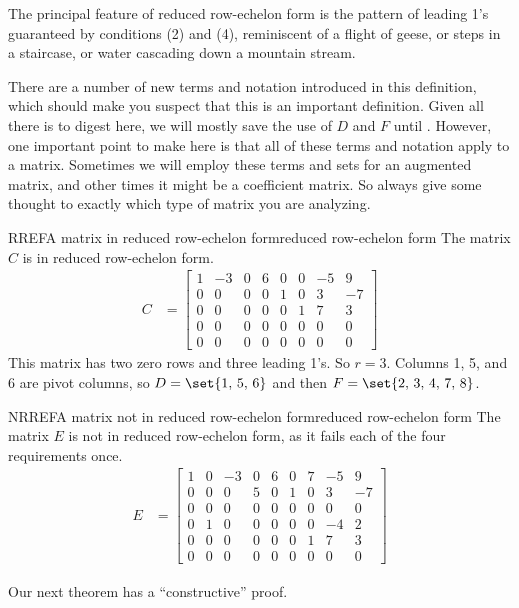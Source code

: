 %
The principal feature of reduced row-echelon form is the pattern of leading 1's guaranteed by conditions (2) and (4), reminiscent of a flight of geese, or steps in a staircase, or water cascading down a mountain stream.\par
%
There are a number of new terms and notation introduced in this definition, which should make you suspect that this is an important definition.  Given all there is to digest here, we will mostly save the use of $D$ and $F$ until .  However, one important point to make here is that all of these terms and notation apply to a matrix.  Sometimes we will employ these terms and sets for an augmented matrix, and other times it might be a coefficient matrix.  So always give some thought to exactly which type of matrix you are analyzing.
%
\begin{example}{RREF}{A matrix in reduced row-echelon form}{reduced row-echelon form}
The matrix $C$ is in reduced row-echelon form.
\begin{align*}
C&=
\begin{bmatrix}
1&-3&0&6&0&0&-5&9\\
0&0&0&0&1&0&3&-7\\
0&0&0&0&0&1&7&3\\
0&0&0&0&0&0&0&0\\
0&0&0&0&0&0&0&0
\end{bmatrix}
\end{align*}
This matrix has two zero rows and three leading 1's.   So $r=3$.  Columns 1, 5, and 6 are pivot columns, so $D=\set{1,\,5,\,6}$ and then $F=\set{2,\,3,\,4,\,7,\,8}$.
\end{example}
%
\begin{example}{NRREF}{A matrix not in reduced row-echelon form}{reduced row-echelon form}
The matrix $E$ is not in reduced row-echelon form, as it fails each of the four requirements once.
\begin{align*}
E&=
\begin{bmatrix}
1&0&-3&0&6&0&7&-5&9\\
0&0&0&5&0&1&0&3&-7\\
0&0&0&0&0&0&0&0&0\\
0&1&0&0&0&0&0&-4&2\\
0&0&0&0&0&0&1&7&3\\
0&0&0&0&0&0&0&0&0
\end{bmatrix}
\end{align*}
\end{example}
%
{Our next theorem has a ``constructive'' proof.}

